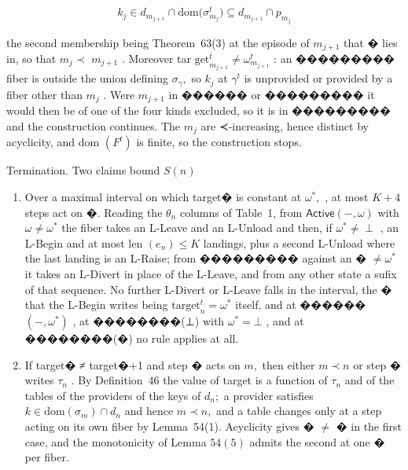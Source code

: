 \documentclass[
  10
]{article}
\begin{document}
\[
k _ { j } \in d _ { m _ { j + 1 } } \cap \mathrm { d o m } \Big ( \sigma _ { m _ { j } } ^ { t } \Big ) \subseteq d _ { m _ { j + 1 } } \cap p _ { m _ { j } }
\]

the second membership being Theorem~63(3) at the episode of
\(m _ { j + 1 }\) that � lies in, so that \(m _ { j } \prec\)
\(m _ { j + 1 }\) . Moreover tar
\(\mathrm { g e t } _ { m _ { j + 1 } } ^ { \bar { t } } \neq \omega _ { m _ { j + 1 } } ^ { t }\)
: an ��������� fiber is outside the union defining
\(\sigma _ { \gamma } ,\) so \(k _ { j }\) at \(\gamma ^ { t }\) is
unprovided or provided by a fiber other than \(m _ { j }\) . Were
\(m _ { j + 1 }\) in ������ or ��������� it would then be of one of the
four kinds excluded, so it is in ��������� and the construction
continues. The \(m _ { j }\) are ≺-increasing, hence distinct by
acyclicity, and dom \(\left( F ^ { t } \right)\) is finite, so the
construction stops.

Termination. Two claims bound \(S ( n )\)

\begin{enumerate}
\def\labelenumi{(\Alph{enumi})}
\item
  Over a maximal interval on which target� is constant at
  \(\omega ^ { * } ,\) , at most \(K + 4\) steps act on �. Reading the
  \(\theta _ { n }\) columns of Table~1, from
  \(\mathsf { A c t i v e } ( - , \omega )\) with
  \(\omega \neq \omega ^ { * }\) the fiber takes an L-Leave and an
  L-Unload and then, if \(\omega ^ { * } \neq \perp\) , an L-Begin and
  at most len \(( e _ { n } ) \leq K\) landings, plus a second L-Unload
  where the last landing is an L-Raise; from ��������� against an �
  \(\neq \omega ^ { * }\) it takes an L-Divert in place of the L-Leave,
  and from any other state a sufix of that sequence. No further L-Divert
  or L-Leave falls in the interval, the � that the L-Begin writes being
  \(\mathrm { t a r g e t } _ { n } ^ { t } = \omega ^ { * }\) itself,
  and at ������ \(( - , \omega ^ { * } )\) , at ��������(⊥) with
  \(\omega ^ { * } = \bot\) , and at ��������(�) no rule applies at all.
\item
  If target� ≠ target�+1 and step � acts on \(m ,\) then either
  \(m \prec n\) or step � writes \(\tau _ { n }\) . By Definition~46 the
  value of target is a function of \(\tau _ { n }\) and of the tables of
  the providers of the keys of \(d _ { n } ;\) a provider satisfies
  \(k \in \mathrm { d o m } ( \sigma _ { m } ) \cap d _ { n }\) and
  hence \(m \prec n ,\) and a table changes only at a step acting on its
  own fiber by Lemma~54(1). Acyclicity gives � \(\neq\) � in the first
  case, and the monotonicity of Lemma \(5 4 ( 5 )\) admits the second at
  one � per fiber.
\end{enumerate}
\end{document}
